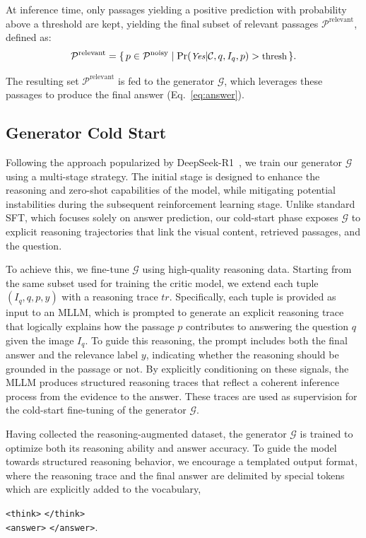 At inference time, only passages yielding a positive prediction with probability above a threshold are kept, yielding the final subset of relevant passages $\mathcal{P}^{\mathrm{relevant}}$, defined as: 
\begin{equation}
\small
\label{eq:critic2}
\mathcal{P}^{\mathrm{relevant}} = 
\{\, p \in \mathcal{P}^{\mathrm{noisy}} \mid \Pr(\textit{Yes} | \mathcal{C}, q, I_{q}, p) > \text{thresh} \,\}.
\end{equation}

The resulting set $\mathcal{P}^{\mathrm{relevant}}$ is fed to the generator $\mathcal{G}$, which leverages these passages to produce the final answer (Eq.~\ref{eq:answer}).

\subsection{Generator Cold Start}
\label{sec:cold_start}
Following the approach popularized by DeepSeek-R1~\cite{guo2025deepseek}, we train our generator $\mathcal{G}$ using a multi-stage strategy. The initial stage is designed to enhance the reasoning and zero-shot capabilities of the model, while mitigating potential instabilities during the subsequent reinforcement learning stage.
Unlike standard SFT, which focuses solely on answer prediction, our cold-start phase exposes $\mathcal{G}$ to explicit reasoning trajectories that link the visual content, retrieved passages, and the question.

To achieve this, we fine-tune $\mathcal{G}$ using high-quality reasoning data. Starting from the same subset used for training the critic model, we extend each tuple $(I_{q}, q, p, y)$ with a reasoning trace $tr$.
Specifically, each tuple is provided as input to an MLLM, which is prompted to generate an explicit reasoning trace that logically explains how the passage $p$ contributes to answering the question $q$ given the image $I_{q}$. To guide this reasoning, the prompt includes both the final answer and the relevance label $y$, indicating whether the reasoning should be grounded in the passage or not. By explicitly conditioning on these signals, the MLLM produces structured reasoning traces that reflect a coherent inference process from the evidence to the answer. These traces are used as supervision for the cold-start fine-tuning of the generator $\mathcal{G}$.

Having collected the reasoning-augmented dataset, the generator $\mathcal{G}$ is trained to optimize both its reasoning ability and answer accuracy.
To guide the model towards structured reasoning behavior, we encourage a templated output format, where the reasoning trace and the final answer are delimited by special tokens which are explicitly added to the vocabulary, \ie
\begin{center}
  \texttt{<think>}  \texttt{</think>} \\ 
  \texttt{<answer>}  \texttt{</answer>}.  
\end{center}


